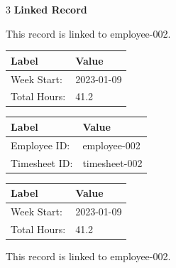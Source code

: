 \documentclass{article}
\begin{document}
\vspace{-10pt}

\begin{multicols}{3}
\textbf{Linked Record}\\
\vspace{-10pt}
\end{multicols}

\noindent
\begin{minipage}[t]{0.45\linewidth}
This record is linked to employee-002.
\end{minipage}\hfill
\begin{minipage}[t]{0.45\linewidth}
\begin{tabularx}{\textwidth}{|l|X|}
\hline
\textbf{Label} & \textbf{Value} \\
\hline
Week Start: & 2023-01-09 \\
Total Hours: & 41.2 \\
\hline
\end{tabularx}
\end{minipage}

\vfill

\noindent
\begin{tabular}{|l|l|}
\hline
\textbf{Label} & \textbf{Value} \\
\hline
Employee ID: & employee-002 \\
Timesheet ID: & timesheet-002 \\
\hline
\end{tabular}

\vfill

\noindent
\begin{minipage}[t]{0.45\linewidth}
\begin{tabularx}{\textwidth}{|l|X|}
\hline
\textbf{Label} & \textbf{Value} \\
\hline
Week Start: & 2023-01-09 \\
Total Hours: & 41.2 \\
\hline
\end{tabularx}
\end{minipage}\hfill
\begin{minipage}[t]{0.45\linewidth}
This record is linked to employee-002.
\end{minipage}

\vspace{-10pt}
\end{document}
